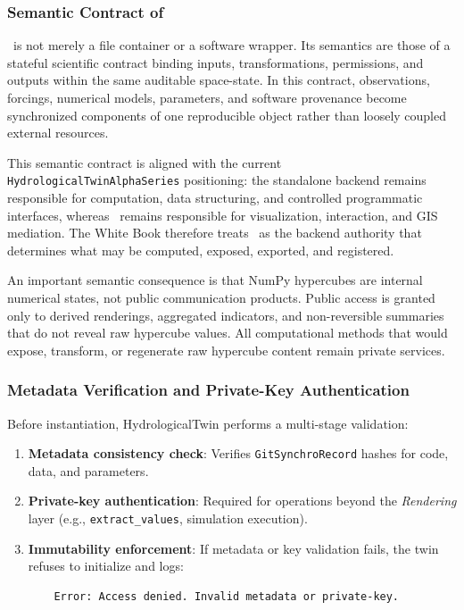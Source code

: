 \subsubsection{Semantic Contract of \hydrot}

\hydrot\ is not merely a file container or a software wrapper. Its semantics are those of a stateful scientific contract binding inputs, transformations, permissions, and outputs within the same auditable space-state. In this contract, observations, forcings, numerical models, parameters, and software provenance become synchronized components of one reproducible object rather than loosely coupled external resources.

This semantic contract is aligned with the current \texttt{HydrologicalTwinAlphaSeries} positioning: the standalone backend remains responsible for computation, data structuring, and controlled programmatic interfaces, whereas \cwv\ remains responsible for visualization, interaction, and GIS mediation. The White Book therefore treats \hydrot\ as the backend authority that determines what may be computed, exposed, exported, and registered.

An important semantic consequence is that NumPy hypercubes are internal numerical states, not public communication products. Public access is granted only to derived renderings, aggregated indicators, and non-reversible summaries that do not reveal raw hypercube values. All computational methods that would expose, transform, or regenerate raw hypercube content remain private services.

\subsubsection{Metadata Verification and Private-Key Authentication}
Before instantiation, HydrologicalTwin performs a multi-stage validation:
\begin{enumerate}
    \item \textbf{Metadata consistency check}: Verifies \texttt{GitSynchroRecord} hashes for code, data, and parameters.
    \item \textbf{Private-key authentication}: Required for operations beyond the \textit{Rendering} layer (e.g., \texttt{extract\_values}, simulation execution).
    \item \textbf{Immutability enforcement}: If metadata or key validation fails, the twin refuses to initialize and logs:
    \begin{verbatim}
    Error: Access denied. Invalid metadata or private-key.
    \end{verbatim}
\end{enumerate}

